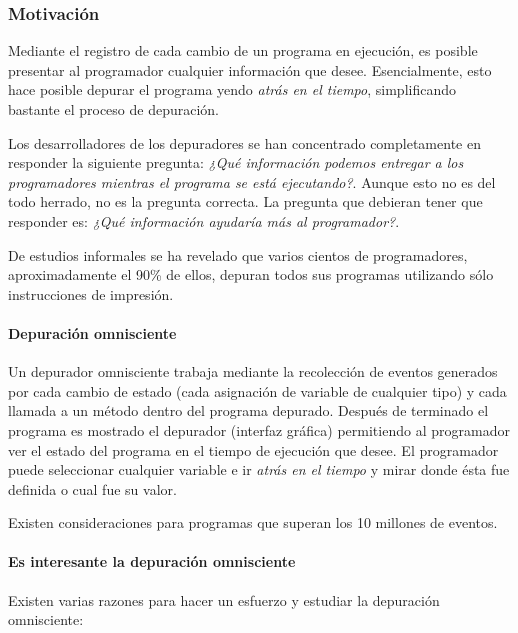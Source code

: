 \documentclass[12pt,legalpaper]{report}
\begin{document}
			\subsubsection{Motivación}

Mediante el registro de cada cambio de un programa en ejecución, es posible presentar al programador cualquier información que desee.  Esencialmente, esto hace posible depurar el programa yendo \textit{atrás en el tiempo}, simplificando bastante el proceso de depuración.


Los desarrolladores de los depuradores se han concentrado completamente en responder la siguiente pregunta: \textit{¿Qué información podemos entregar a los programadores mientras el programa se está ejecutando?}.  Aunque esto no es del todo herrado, no es la pregunta correcta.  La pregunta que debieran tener que responder es: \textit{¿Qué información ayudaría más al programador?}.

De estudios informales se ha revelado que varios cientos de programadores, aproximadamente el 90\% de ellos, depuran todos sus programas utilizando sólo instrucciones de impresión.


			\paragraph{Depuración omnisciente}

Un depurador omnisciente trabaja mediante la recolección de eventos generados por cada cambio de estado (cada asignación de variable de cualquier tipo) y cada llamada a un método dentro del programa depurado.  Después de terminado el programa es mostrado el depurador (interfaz gráfica) permitiendo al programador ver el estado del programa en el tiempo de ejecución que desee.  El programador puede seleccionar cualquier variable e ir \textit{atrás en el tiempo} y mirar donde ésta fue definida o cual fue su valor.

Existen consideraciones para programas que superan los 10 millones de eventos.


			\paragraph[Estudio interesante]{Es interesante la depuración omnisciente}

Existen varias razones para hacer un esfuerzo y estudiar la depuración omnisciente:
\end{document}
